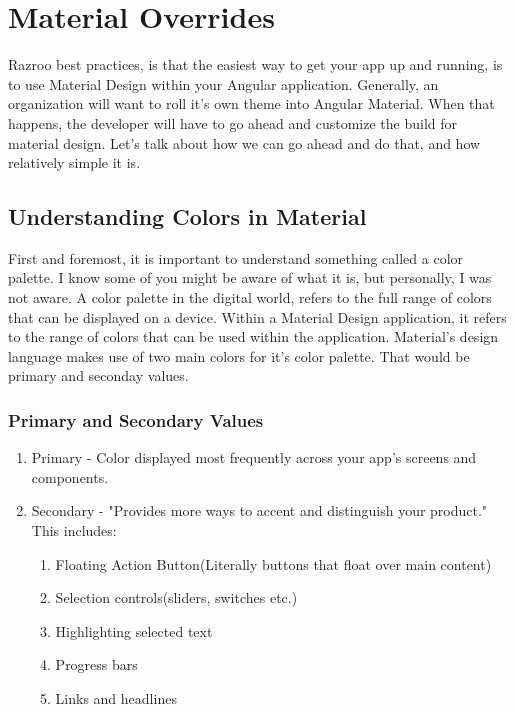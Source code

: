 
\chapter{ Material Overrides }

Razroo best practices, is that the easiest way to get your app up and running,
is to use Material Design within your Angular application. Generally, an
organization will want to roll it's own theme into Angular Material. When that
happens, the developer will have to go ahead and customize the build for 
material design. Let's talk about how we can go ahead and do that, and how
relatively simple it is.

\section{Understanding Colors in Material}
First and foremost, it is important to understand something called a color 
palette. I know some of you might be aware of what it is, but personally, I was
not aware. A color palette in the digital world, refers to the full range of 
colors that can be displayed on a device. Within a Material Design application,
it refers to the range of colors that can be used within the application. 
Material's design language makes use of two main colors for it's color palette.
That would be primary and seconday values. 

\subsection{Primary and Secondary Values}
\begin{enumerate}
  \item Primary - Color displayed most frequently across your app's screens and
  components. 
  \item Secondary - "Provides more ways to accent and distinguish your product." This includes:
  \begin{enumerate}
    \item Floating Action Button(Literally buttons that float over main content)
    \item Selection controls(sliders, switches etc.)
    \item Highlighting selected text
    \item Progress bars
    \item Links and headlines
  \end{enumerate}
\end{enumerate}


